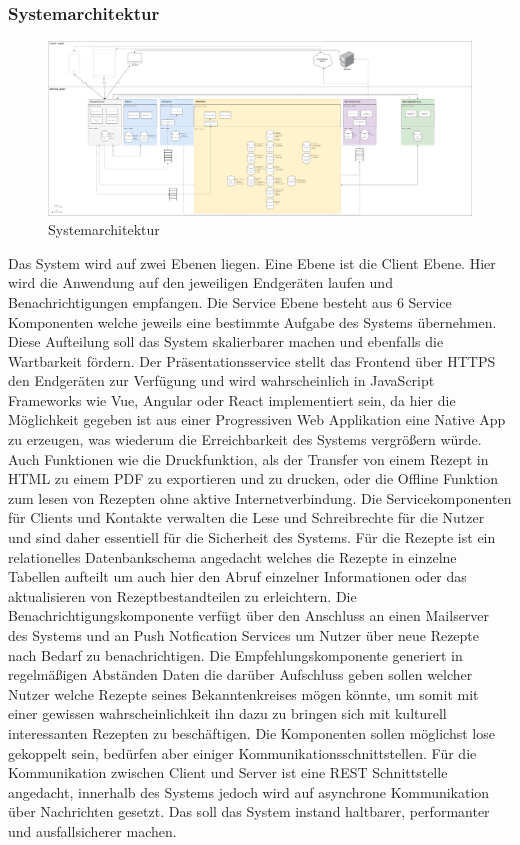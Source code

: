 \subsubsection{Systemarchitektur}
\begin{figure}[h] %
    \includegraphics[width=1\textwidth]{images/systemarchitechure.png}
    \caption[Systemarchitektur]{Systemarchitektur}
    \label{fig:systemarchitechure}
\end{figure}
Das System wird auf zwei Ebenen liegen. Eine Ebene ist die Client Ebene. Hier wird die Anwendung auf den jeweiligen Endgeräten laufen und Benachrichtigungen empfangen. Die Service Ebene besteht aus 6 Service Komponenten welche jeweils eine bestimmte Aufgabe des Systems übernehmen. Diese Aufteilung soll das System skalierbarer machen und ebenfalls die Wartbarkeit fördern. Der Präsentationsservice stellt das Frontend über HTTPS den Endgeräten zur Verfügung und wird wahrscheinlich in JavaScript Frameworks wie Vue, Angular oder React implementiert sein, da hier die Möglichkeit gegeben ist aus einer Progressiven Web Applikation eine Native App zu erzeugen, was wiederum die Erreichbarkeit des Systems vergrößern würde. Auch Funktionen wie die Druckfunktion, als der Transfer von einem Rezept in HTML zu einem PDF zu exportieren und zu drucken, oder die Offline Funktion zum lesen von Rezepten ohne aktive Internetverbindung. Die Servicekomponenten für Clients und Kontakte verwalten die Lese und Schreibrechte für die Nutzer und sind daher essentiell für die Sicherheit des Systems. Für die Rezepte ist ein relationelles Datenbankschema angedacht welches die Rezepte in einzelne Tabellen aufteilt um auch hier den Abruf einzelner Informationen oder das aktualisieren von Rezeptbestandteilen zu erleichtern. Die Benachrichtigungskomponente verfügt über den Anschluss an einen Mailserver des Systems und an Push Notfication Services um Nutzer über neue Rezepte nach Bedarf zu benachrichtigen. Die Empfehlungskomponente generiert in regelmäßigen Abständen Daten die darüber Aufschluss geben sollen welcher Nutzer welche Rezepte seines Bekanntenkreises mögen könnte, um somit mit einer gewissen wahrscheinlichkeit ihn dazu zu bringen sich mit kulturell interessanten Rezepten zu beschäftigen. Die Komponenten sollen möglichst lose gekoppelt sein, bedürfen aber einiger Kommunikationsschnittstellen. Für die Kommunikation zwischen Client und Server ist eine REST Schnittstelle angedacht, innerhalb des Systems jedoch wird auf asynchrone Kommunikation über Nachrichten gesetzt. Das soll das System instand haltbarer, performanter und ausfallsicherer machen. \\
